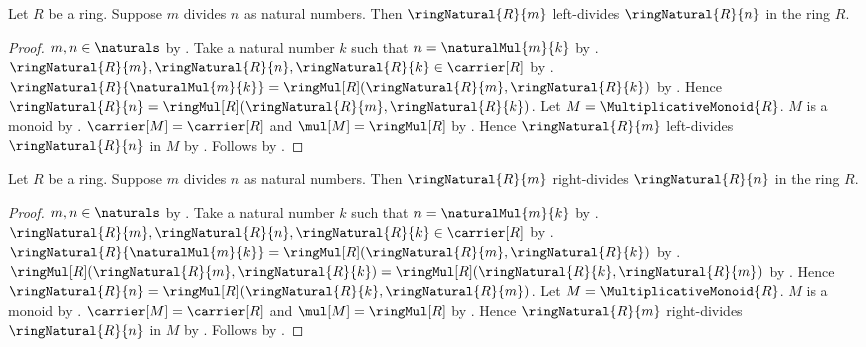 \begin{theorem}\label{ring_natural_left_divisibility}
    Let $R$ be a ring.
    Suppose $m$ divides $n$ as natural numbers.
    Then $\ringNatural{R}{m}$ left-divides $\ringNatural{R}{n}$
        in the ring $R$.
\end{theorem}
\begin{proof}
    $m,n\in\naturals$ by
        .
    Take a natural number $k$ such that
        $n=\naturalMul{m}{k}$ by
        .
    $\ringNatural{R}{m},\ringNatural{R}{n},
        \ringNatural{R}{k}\in\carrier[R]$ by
        .
    $\ringNatural{R}{\naturalMul{m}{k}}
        =\ringMul[R](\ringNatural{R}{m},\ringNatural{R}{k})$ by
        .
    Hence $\ringNatural{R}{n}
        =\ringMul[R](\ringNatural{R}{m},\ringNatural{R}{k})$.
    Let $M=\MultiplicativeMonoid{R}$.
    $M$ is a monoid by .
    $\carrier[M]=\carrier[R]$ and $\mul[M]=\ringMul[R]$ by
        .
    Hence $\ringNatural{R}{m}$ left-divides $\ringNatural{R}{n}$ in $M$ by
        .
    Follows by .
\end{proof}

\begin{theorem}\label{ring_natural_right_divisibility}
    Let $R$ be a ring.
    Suppose $m$ divides $n$ as natural numbers.
    Then $\ringNatural{R}{m}$ right-divides $\ringNatural{R}{n}$
        in the ring $R$.
\end{theorem}
\begin{proof}
    $m,n\in\naturals$ by
        .
    Take a natural number $k$ such that
        $n=\naturalMul{m}{k}$ by
        .
    $\ringNatural{R}{m},\ringNatural{R}{n},
        \ringNatural{R}{k}\in\carrier[R]$ by
        .
    $\ringNatural{R}{\naturalMul{m}{k}}
        =\ringMul[R](\ringNatural{R}{m},\ringNatural{R}{k})$ by
        .
    $\ringMul[R](\ringNatural{R}{m},\ringNatural{R}{k})
        =\ringMul[R](\ringNatural{R}{k},\ringNatural{R}{m})$ by
        .
    Hence $\ringNatural{R}{n}
        =\ringMul[R](\ringNatural{R}{k},\ringNatural{R}{m})$.
    Let $M=\MultiplicativeMonoid{R}$.
    $M$ is a monoid by .
    $\carrier[M]=\carrier[R]$ and $\mul[M]=\ringMul[R]$ by
        .
    Hence $\ringNatural{R}{m}$ right-divides $\ringNatural{R}{n}$ in $M$ by
        .
    Follows by .
\end{proof}

